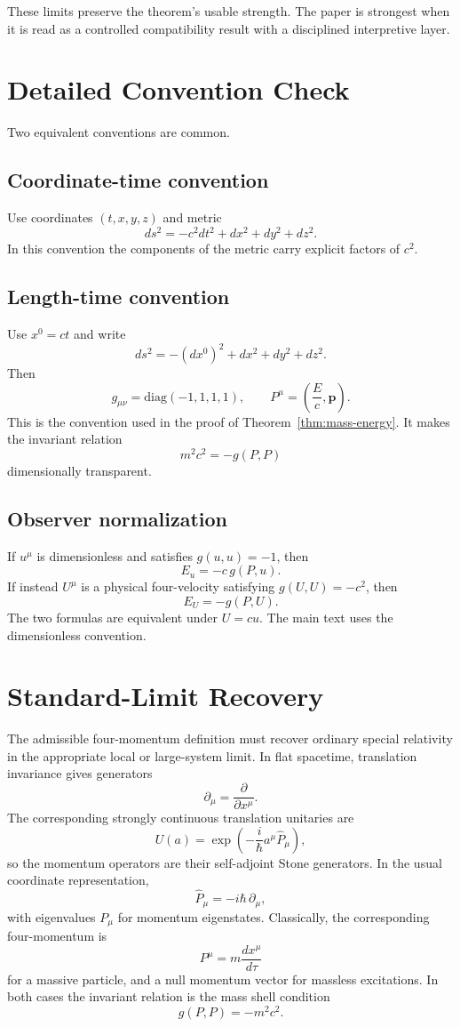 \documentclass[12pt,a4paper]{article}
\theoremstyle{definition}
\theoremstyle{remark}
\begin{document}
These limits preserve the theorem's usable strength. The paper is strongest when it is read as a controlled compatibility result with a disciplined interpretive layer.

\appendix
\section{Detailed Convention Check}
\label{app:conventions}

Two equivalent conventions are common.

\subsection{Coordinate-time convention}

Use coordinates $(t,x,y,z)$ and metric
\[
ds^2=-c^2dt^2+dx^2+dy^2+dz^2.
\]
In this convention the components of the metric carry explicit factors of $c^2$.

\subsection{Length-time convention}

Use $x^0=ct$ and write
\[
ds^2=-(dx^0)^2+dx^2+dy^2+dz^2.
\]
Then
\[
g_{\mu\nu}=\mathrm{diag}(-1,1,1,1),
\qquad
P^\mu=\left(\frac{E}{c},\mathbf p\right).
\]
This is the convention used in the proof of Theorem~\ref{thm:mass-energy}. It makes the invariant relation
\[
m^2c^2=-g(P,P)
\]
dimensionally transparent.

\subsection{Observer normalization}

If $u^\mu$ is dimensionless and satisfies $g(u,u)=-1$, then
\[
E_u=-c\,g(P,u).
\]
If instead $U^\mu$ is a physical four-velocity satisfying $g(U,U)=-c^2$, then
\[
E_U=-g(P,U).
\]
The two formulas are equivalent under $U=cu$. The main text uses the dimensionless convention.

\section{Standard-Limit Recovery}
\label{app:standard-limit}

The admissible four-momentum definition must recover ordinary special relativity in the appropriate local or large-system limit. In flat spacetime, translation invariance gives generators
\[
\partial_\mu=\frac{\partial}{\partial x^\mu}.
\]
The corresponding strongly continuous translation unitaries are
\[
U(a)=\exp\!\left(-\frac{i}{\hbar}a^\mu\hat P_\mu\right),
\]
so the momentum operators are their self-adjoint Stone generators. In the usual coordinate representation,
\[
\hat P_\mu=-i\hbar\,\partial_\mu,
\]
with eigenvalues $P_\mu$ for momentum eigenstates. Classically, the corresponding four-momentum is
\[
P^\mu=m\frac{dx^\mu}{d\tau}
\]
for a massive particle, and a null momentum vector for massless excitations. In both cases the invariant relation is the mass shell condition
\[
g(P,P)=-m^2c^2.
\]
\end{document}
